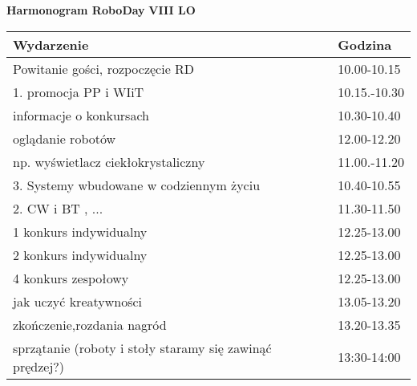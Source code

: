 \documentclass{article}
\begin{document}
\begin{center}
\Large\textbf{Harmonogram RoboDay}
\large\textbf{VIII LO}
\end{center}
\vspace{1cm}
\begin{center}
\begin{tabular}{|l|l|}
\hline
\textbf{Wydarzenie} & \textbf{Godzina} \\
\hline
Powitanie gości, rozpoczęcie RD & 10.00-10.15 \\
\hline
1. promocja PP i WIiT & 10.15.-10.30 \\
\hline
informacje o konkursach & 10.30-10.40 \\
\hline
oglądanie robotów & 12.00-12.20 \\
\hline
np. wyświetlacz ciekłokrystaliczny & 11.00.-11.20 \\
\hline
3. Systemy wbudowane w codziennym życiu & 10.40-10.55 \\
\hline
2. CW i BT , ... & 11.30-11.50 \\
\hline
1 konkurs indywidualny & 12.25-13.00 \\
\hline
2 konkurs indywidualny & 12.25-13.00 \\
\hline
4 konkurs zespołowy & 12.25-13.00 \\
\hline
jak uczyć kreatywności & 13.05-13.20 \\
\hline
zkończenie,rozdania nagród & 13.20-13.35 \\
\hline
sprzątanie (roboty i stoły staramy się zawinąć prędzej?) & 13:30-14:00 \\
\hline
\end{tabular}
\end{center}
\end{document}
